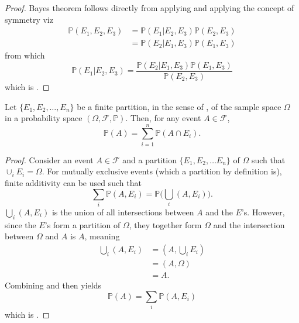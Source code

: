 \begin{proof}
	Bayes theorem follows directly from applying  and applying the concept of symmetry viz
	\begin{equation}
		\begin{split}
			\mathbb{P}(E_1,E_2,E_3) &= \mathbb{P}(E_1| E_2,E_3)\mathbb{P}(E_2,E_3) \\
			& = \mathbb{P}(E_2|E_1,E_3)\mathbb{P}(E_1,E_3)
		\end{split}
		\label{eq:c2}
	\end{equation}
	from which
	\begin{equation}
		\mathbb{P}(E_1| E_2,E_3) = \frac{\mathbb{P}(E_2| E_1,E_3)\mathbb{P}(E_1,E_3)}{\mathbb{P}(E_2,E_3)}
	\end{equation}
	which is .
\end{proof}

\begin{theorem}
	\label{theorem:law_of_total_probability}
	Let $\{E_1, E_2, \dots, E_n\}$ be a finite partition, in the sense of , of the sample space $\Omega$ in a probability space $(\Omega, \mathcal{F}, \mathbb{P})$. Then, for any event $A \in \mathcal{F}$,
	\begin{equation}
		\mathbb{P}(A) = \sum_{i=1}^n \mathbb{P}(A \cap E_i).
		\label{eq:law_total_probability}
	\end{equation}
\end{theorem}

\begin{proof}
	Consider an event $A\in \mathcal{F}$ and a partition $\{E_1,E_2,\dots E_n\}$ of $\Omega$ such that $\cup_{i}E_i=\Omega$. For mutually exclusive events (which a partition by definition is), finite additivity can be used such that
	\begin{equation}
		\sum_{i}\mathbb{P}(A,E_i) = \mathbb{P}\bigg(\bigcup_{i}(A,E_i)\bigg).
		\label{eq:qq1}
	\end{equation} 
	$\bigcup_{i}(A,E_i)$ is the union of all intersections between $A$ and the $E$'s. However, since the $E$'s form a partition of $\Omega$, they together form $\Omega$ and the intersection between $\Omega$ and $A$ is $A$, meaning
	\begin{equation}
		\begin{split}
			\bigcup_{i}(A,E_i)  &= (A,\bigcup_{i}E_i)\\
			&= (A,\Omega)\\
			& =A.
		\end{split}
		\label{eq:qq2}
	\end{equation}
	Combining  and  then yields
	\begin{equation}
		\mathbb{P}(A) = \sum_{i} \mathbb{P}(A, E_i)
	\end{equation}
	which is .
\end{proof}

